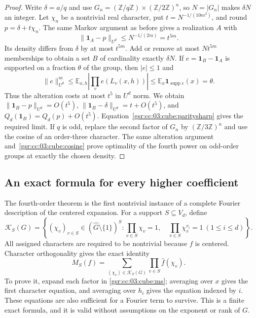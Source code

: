 \documentclass[11pt,letterpaper]{article}
\numberwithin{equation}{section}
\theoremstyle{definition}
\theoremstyle{remark}
\newcommand{\E}{\mathbb E}
\newcommand{\Z}{\mathbb Z}
\newcommand{\1}{\mathbf 1}
\begin{document}
\begin{proof}
Write $\delta=a/q$ and use
$G_n=(\Z/q\Z)\times(\Z/2\Z)^n$, so $N=|G_n|$ makes $\delta N$
an integer. Let $\chi_n$ be a nontrivial real character, put
$t=N^{-1/(10m^2)}$, and round $p=\delta+t\chi_n$.
The same Markov argument as before gives a realization $A$ with
\[
 \|\1_A-p\|_{U^d}\le N^{-1/(2m)}=t^{5m}.
\]
Its density differs from $\delta$ by at most $t^{5m}$. Add or remove
at most $Nt^{5m}$ memberships to obtain a set $B$ of cardinality exactly
$\delta N$. If $e=\1_B-\1_A$ is supported on a fraction $\theta$
of the group, then $|e|\le1$ and
\[
 \|e\|_{U^d}^{m}
 \le\E_{x,h}\left|\prod_v e(L_v(x,h))\right|
 \le\E_x\1_{\operatorname{supp}e}(x)=\theta.
\]
Thus the alteration costs at most $t^5$ in $U^d$ norm.
We obtain $\|\1_B-p\|_{U^d}=O(t^5)$,
$\|\1_B-\delta\|_{U^d}=t+O(t^5)$, and
$Q_d(\1_B)=Q_d(p)+O(t^5)$. Equation~\eqref{gsr:cc:03:cube:paritysharp} gives
the required limit. If $q$ is odd, replace the second factor of $G_n$
by $(\Z/3\Z)^n$ and use the cosine of an order-three character.
The same alteration argument and~\eqref{gsr:cc:03:cube:cosine} prove optimality
of the fourth power on odd-order groups at exactly the chosen density.
\end{proof}

\subsection{An exact formula for every higher coefficient}

The fourth-order theorem is the first nontrivial instance of a complete
Fourier description of the centered expansion.  For a support
$S\subseteq V_d$, define
\[
 \mathcal K_S(G)=
 \left\{(\chi_v)_{v\in S}\in
               (\widehat G\setminus\{1\})^S:
 \prod_{v\in S}\chi_v=1,\quad
 \prod_{v\in S}\chi_v^{v_i}=1\ (1\leq i\leq d)\right\}.
\]
All assigned characters are required to be nontrivial because $f$ is
centered.  Character orthogonality gives the exact identity
\begin{equation}
 M_S(f)=\sum_{(\chi_v)\in\mathcal K_S(G)}
                       \prod_{v\in S}\widehat f(\chi_v).
 \label{gsr:cc:03:cube:fullfourier}
\end{equation}
To prove it, expand each factor in \eqref{gsr:cc:03:cube:ms}; averaging over $x$
gives the first character equation, and averaging over $h_i$ gives the
equation indexed by $i$.  These equations are also sufficient for a
Fourier term to survive.  This is a finite exact formula, and it is
valid without assumptions on the exponent or rank of $G$.
\end{document}
